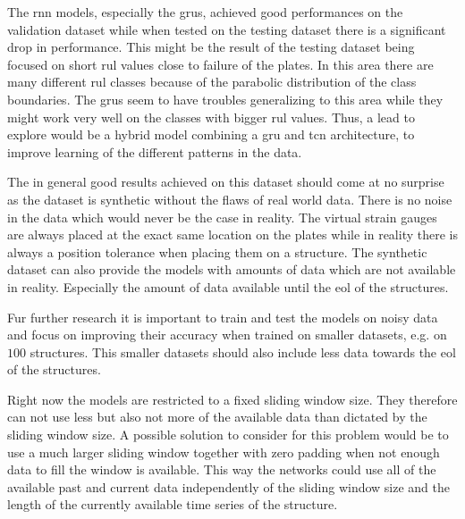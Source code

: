 \documentclass[conference]{IEEEtran}
\begin{document}
The \gls{rnn} models, especially the \glspl{gru}, achieved good performances on the validation dataset while when tested on the testing dataset there is a significant drop in performance. This might be the result of the testing dataset being focused on short \gls{rul} values close to failure of the plates. In this area there are many different \gls{rul} classes because of the parabolic distribution of the class boundaries. The \glspl{gru} seem to have troubles generalizing to this area while they might work very well on the classes with bigger \gls{rul} values. Thus, a lead to explore would be a hybrid model combining a \gls{gru} and \gls{tcn} architecture, to improve learning of the different patterns in the data.

The in general good results achieved on this dataset should come at no surprise as the dataset is synthetic without the flaws of real world data. There is no noise in the data which would never be the case in reality. The virtual strain gauges are always placed at the exact same location on the plates while in reality there is always a position tolerance when placing them on a structure. The synthetic dataset can also provide the models with amounts of data which are not available in reality. Especially the amount of data available until the \gls{eol} of the structures.

Fur further research it is important to train and test the models on noisy data and focus on improving their accuracy when trained on smaller datasets, e.g. on $ 100 $ structures. This smaller datasets should also include less data towards the \gls{eol} of the structures.

Right now the models are restricted to a fixed sliding window size. They therefore can not use less but also not more of the available data than dictated by the sliding window size. A possible solution to consider for this problem would be to use a much larger sliding window together with zero padding when not enough data to fill the window is available. This way the networks could use all of the available past and current data independently of the sliding window size and the length of the currently available time series of the structure.

\printbibliography
\end{document}
